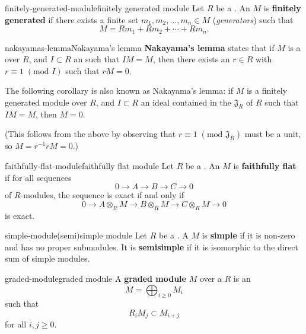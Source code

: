 \begin{topic}{finitely-generated-module}{finitely generated module}
    Let $R$ be a . An  $M$ is \textbf{finitely generated} if there exists a finite set $m_1, m_2, \ldots, m_n \in M$ (\textit{generators}) such that
    \[ M = R m_1 + R m_2 + \cdots + R m_n . \]
\end{topic}

\begin{topic}{nakayamas-lemma}{Nakayama's lemma}
    \textbf{Nakayama's lemma} states that if $M$ is a  over $R$, and $I \subset R$ an  such that $IM = M$, then there exists an $r \in R$ with $r \equiv 1 \; (\text{mod } I)$ such that $rM = 0$.
    
    The following corollary is also known as Nakayama's lemma: if $M$ is a finitely generated module over $R$, and $I \subset R$ an ideal contained in the  $\mathfrak{J}_R$ of $R$ such that $IM = M$, then $M = 0$.
    
    (This follows from the above by observing that $r \equiv 1 \; (\text{mod } \mathfrak{J}_R)$ must be a unit, so $M = r^{-1} r M = 0$.)
\end{topic}

\begin{topic}{faithfully-flat-module}{faithfully flat module}
    Let $R$ be a . An  $M$ is \textbf{faithfully flat} if for all sequences
    \[ 0 \to A \to B \to C \to 0 \]
    of $R$-modules, the sequence is exact if and only if
    \[ 0 \to A \otimes_R M \to B \otimes_R M \to C \otimes_R M \to 0 \]
    is exact.
\end{topic}

\begin{topic}{simple-module}{(semi)simple module}
    Let $R$ be a . A  $M$ is \textbf{simple} if it is non-zero and has no proper submodules. It is \textbf{semisimple} if it is isomorphic to the direct sum of simple modules.
\end{topic}

\begin{topic}{graded-module}{graded module}
    A \textbf{graded module} $M$ over a  $R$ is an 
    \[ M = \bigoplus_{i \ge 0} M_i \]
    such that
    \[ R_i M_j \subset M_{i + j} \]
    for all $i, j \ge 0$.
\end{topic}

